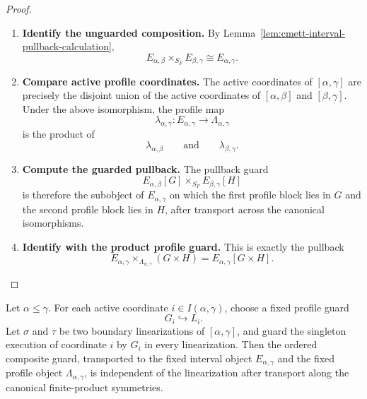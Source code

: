 \begin{proof}
    \leavevmode
    \begin{enumerate}
        \item \textbf{Identify the unguarded composition.}
        By Lemma~\ref{lem:cmett-interval-pullback-calculation},
        \[
            E_{\alpha,\beta}\times_{S_F}E_{\beta,\gamma}
            \cong
            E_{\alpha,\gamma}.
        \]

        \item \textbf{Compare active profile coordinates.}
        The active coordinates of \([\alpha,\gamma]\) are precisely the
        disjoint union of the active coordinates of \([\alpha,\beta]\) and
        \([\beta,\gamma]\). Under the above isomorphism, the profile map
        \[
            \lambda_{\alpha,\gamma}:E_{\alpha,\gamma}\to\Lambda_{\alpha,\gamma}
        \]
        is the product of
        \[
            \lambda_{\alpha,\beta}
            \qquad\text{and}\qquad
            \lambda_{\beta,\gamma}.
        \]

        \item \textbf{Compute the guarded pullback.}
        The pullback guard
        \[
            E_{\alpha,\beta}[G]\times_{S_F}E_{\beta,\gamma}[H]
        \]
        is therefore the subobject of \(E_{\alpha,\gamma}\) on which the
        first profile block lies in \(G\) and the second profile block lies in
        \(H\), after transport across the canonical isomorphisms.

        \item \textbf{Identify with the product profile guard.}
        This is exactly the pullback
        \[
            E_{\alpha,\gamma}
            \times_{\Lambda_{\alpha,\gamma}}
            (G\times H)
            =
            E_{\alpha,\gamma}[G\times H].
        \]
    \end{enumerate}
\end{proof}

\begin{theorem}
\label{thm:cmett-order-independence-profile-guards}
    Let \(\alpha\leq\gamma\). For each active coordinate
    \(i\in I(\alpha,\gamma)\), choose a fixed profile guard
    \[
        G_i\hookrightarrow L_i.
    \]
    Let \(\sigma\) and \(\tau\) be two boundary linearizations of
    \([\alpha,\gamma]\), and guard the singleton execution of coordinate
    \(i\) by \(G_i\) in every linearization. Then the ordered composite
    guard, transported to the fixed interval object \(E_{\alpha,\gamma}\) and
    the fixed profile object \(\Lambda_{\alpha,\gamma}\), is independent of
    the linearization after transport along the canonical finite-product
    symmetries.
\end{theorem}

